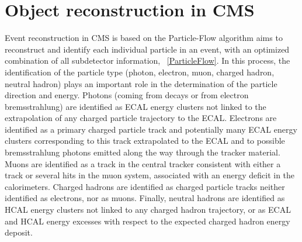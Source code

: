 \chapter{Object reconstruction in CMS}
\label{Chapter1}
\newcommand{\cPqb}{\ensuremath{\cmsSymbolFace{b}}}

Event reconstruction in CMS is based on the Particle-Flow algorithm \cite{ParticleFlow} aims to reconstruct and identify each individual particle in an event, with an optimized combination of all subdetector information, \figurename~\ref{ParticleFlow}. In this process, the identification of the particle type (photon, electron, muon, charged hadron, neutral hadron) plays an important role in the determination of the particle direction and energy. Photons (\eg  coming from \Pgpz decays or from electron bremsstrahlung) are identified as ECAL energy clusters not linked to the extrapolation of any charged particle trajectory to the ECAL. Electrons %
are identified as a primary charged particle track and potentially many ECAL energy clusters corresponding to this track extrapolated to the ECAL and to possible bremsstrahlung photons emitted along the way through the tracker material. Muons %
are identified as a track in the central tracker consistent with either a track or several hits in the muon system, associated with an energy deficit in the calorimeters. Charged hadrons are identified as charged particle tracks neither identified as electrons, nor as muons. Finally, neutral hadrons are identified as HCAL energy clusters not linked to any charged hadron trajectory, or as ECAL and HCAL energy excesses with respect to the expected charged hadron energy deposit.
